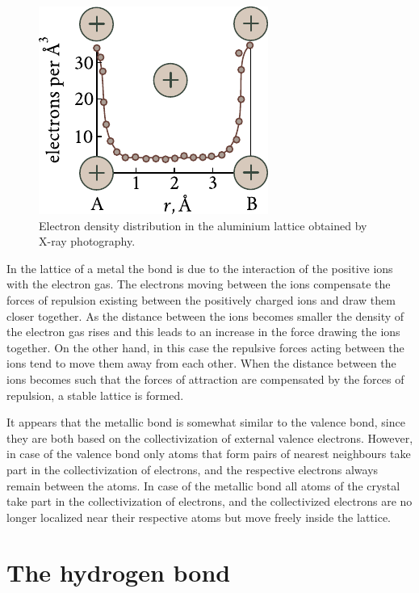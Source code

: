 \begin{figure}[t]
	\begin{center}
		\includegraphics[scale=0.85]{figures/ch_01/fig_1_8.pdf}
		\caption[]{Electron density distribution in the aluminium lattice obtained by X-ray photography.}
		\label{fig:1_8}
	\end{center}
	\vspace{-0.7cm}
\end{figure}

In the lattice of a metal the bond is due to the interaction of the positive ions with the electron gas. The electrons moving between the ions compensate the forces of repulsion existing between the positively charged ions and draw them closer together. As the distance between the ions becomes smaller the density of the electron gas rises and this leads to an increase in the force drawing the ions together. On the other hand, in this case the repulsive forces acting between the ions tend to move them away from each other. When the distance between the ions becomes such that the forces of attraction are compensated by the forces of repulsion, a stable lattice is formed.

It appears that the metallic bond is somewhat similar to the valence bond, since they are both based on the collectivization of external valence electrons. However, in case of the valence bond only atoms that form pairs of nearest neighbours take part in the collectivization of electrons, and the respective electrons always remain between the atoms. In case of the metallic bond all atoms of the crystal take part in the collectivization of electrons, and the collectivized electrons are no longer localized near their respective atoms but move freely inside the lattice.

\section{The hydrogen bond}\label{sec:1_5}

